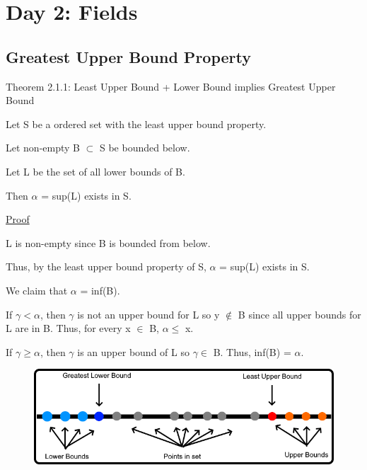 \newpage
\section[Day 2: Fields and Order]{Day 2: Fields}





\subsection{Greatest Upper Bound Property}

{ \color{red} Theorem 2.1.1: Least Upper Bound + Lower Bound implies Greatest Upper Bound }
	\begin{adjustbox}{minipage=14cm, right}
		Let S be a ordered set with the least upper bound property.

		Let non-empty B $\subset$ S be bounded below.

		Let L be the set of all lower bounds of B.

		Then $\alpha$ = sup(L) exists in S.
	\end{adjustbox}

{ \color{magenta} \underline{Proof} }

	L is non-empty since B is bounded from below.

	Thus, by the least upper bound property of S, $\alpha$ = sup(L) exists in S.

	We claim that $\alpha$ = inf(B).

	If $\gamma < \alpha$, then $\gamma$ is not an upper bound for L so y $\not \in$ B
	since all upper bounds for L are in B.
	Thus, for every x $\in$ B, $\alpha \leq$ x.

	If $\gamma \geq \alpha$, then $\gamma$ is an upper bound of L so $\gamma \in$ B.
	Thus, inf(B) = $\alpha$.

\begin{figure}[h]
	\centering
	\includegraphics[scale=0.45]{Images/2.1.png}
\end{figure}





